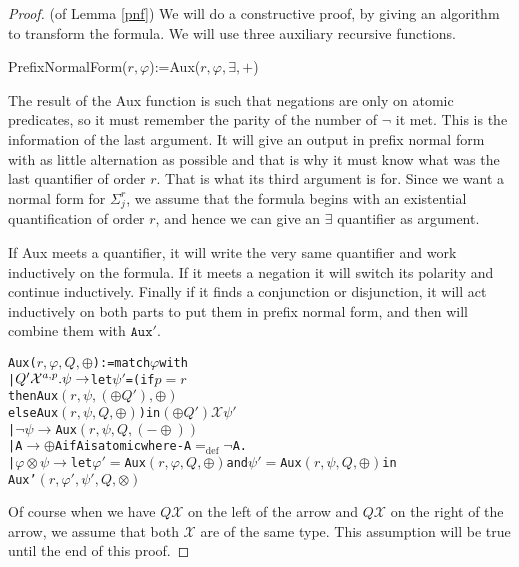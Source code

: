 \documentclass[a4paper,12pt]{article}
\theoremstyle{definition}
\renewcommand{\phi}{\varphi}
\newcommand{\hob}[2]{\ensuremath{\Sigma^{#1}_{#2}}}
\newcommand{\mc}{\mathcal}
\newcommand{\ed}{=_{\mathrm{def}}}
\begin{document}
\begin{proof}(of Lemma \ref{pnf}) We will do a constructive proof, by
  giving an algorithm to transform the formula. We will use three
  auxiliary recursive functions.

\begin{texttt}
  PrefixNormalForm(\(r,\phi\)):=Aux(\(r,\phi,\exists,+\))
\end{texttt}

The result of the Aux function is such that negations are only on
atomic predicates, so it must remember the parity of the number of
$\neg$ it met. This is the information of the last argument. It will
give an output in prefix normal form with as little alternation as
possible and that is why it must know what was the last quantifier of
order $r$. That is what its third argument is for.  Since we want a
normal form for \hob r j, we assume that the formula begins with an
existential quantification of order $r$, and hence we can give an
$\exists$ quantifier as argument.

If Aux meets a quantifier, it will write the very same quantifier and
work inductively on the formula. If it meets a negation it will switch
its polarity and continue inductively. Finally if it finds a
conjunction or disjunction, it will act inductively on both parts to
put them in prefix normal form, and then will combine them with
$\texttt{Aux}'$.

\begin{alltt}
Aux(\(r,\phi,Q,\oplus\)):=match \(\phi\) with
  |\(Q'\mc{X}\sp{a,p}.\psi\rightarrow \)let \(\psi'\)=(if \(p=r\)
     then Aux\((r,\psi,(\oplus{}Q'),\oplus)\)
     else Aux\((r,\psi,Q,\oplus)\))  in \((\oplus{}Q')\mc{X}\psi'\)
  |\(\neg\psi\rightarrow\) Aux\((r,\psi,Q,(-\oplus))\)
  |A\(\rightarrow\oplus\)A   if A is atomic where -A\(\ed\neg\)A.
  |\(\phi\otimes\psi\rightarrow\)let \(\phi'=\)Aux\((r,\phi,Q,\oplus)\) and \(\psi'=\)Aux\((r,\psi,Q,\oplus)\)  in
    Aux'\((r,\phi',\psi',Q,\otimes)\)
\end{alltt}

Of course when we have $Q\mc X$ on the left of the arrow and $Q\mc X$
on the right of the arrow, we assume that both $\mc X$ are of the same
type. This assumption will be true until the end of this proof.


\end{proof}
\end{document}

